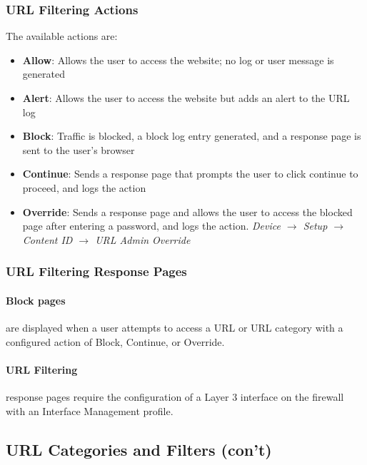 \subsubsection{URL Filtering Actions}
The available actions are:
    \begin{itemize}
        \item \textbf{Allow}: Allows the user to access the website; no log or user message is generated
        \item \textbf{Alert}: Allows the user to access the website but adds an alert to the URL log
        \item \textbf{Block}: Traffic is blocked, a block log entry generated, and a response page is sent to the user's browser
        \item \textbf{Continue}: Sends a response page that prompts the user to click continue to proceed, and logs the action
        \item \textbf{Override}: Sends a response page and allows the user to access the blocked page after entering a password, and logs the action. \textit{Device $\rightarrow$ Setup $\rightarrow$ Content ID $\rightarrow$ URL Admin Override}
    \end{itemize}

\subsubsection{URL Filtering Response Pages}
\paragraph{Block pages}are displayed when a user attempts to access a URL or URL category with a configured action of
Block, Continue, or Override.

\paragraph{URL Filtering}response pages require the configuration of a Layer 3 interface on the firewall with an Interface Management profile. 

\subsection{URL Categories and Filters (con't)}
